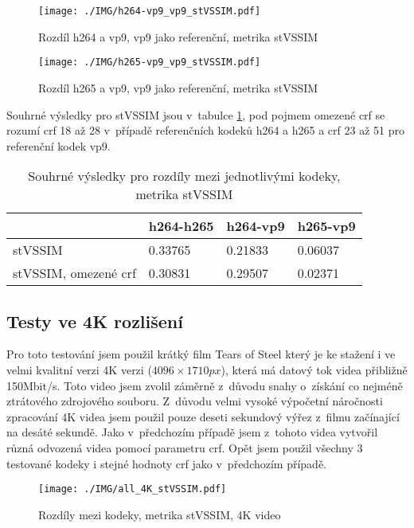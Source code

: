 \documentclass[thesis=M,czech]{FITthesis}[2016/06/26]
\begin{document}
\begin{figure}[htb]\centering
\texttt{[image: ./IMG/h264-vp9\_vp9\_stVSSIM.pdf]}
\caption{Rozdíl h264 a vp9, vp9 jako referenční, metrika stVSSIM}
\label{fig:h264-vp9_vp9_stVSSIM}
\end{figure}

\begin{figure}[htb]\centering
\texttt{[image: ./IMG/h265-vp9\_vp9\_stVSSIM.pdf]}
\caption{Rozdíl h265 a vp9, vp9 jako referenční, metrika stVSSIM}
\label{fig:h265-vp9_vp9_stVSSIM}
\end{figure}

Souhrné výsledky pro stVSSIM jsou v~tabulce \ref{tab:stVSSIM_results}, pod pojmem omezené crf se rozumí crf 18 až 28 v~případě referenčních kodeků h264 a h265 a crf 23 až 51 pro referenční kodek vp9.
\begin{table}[]
\centering
\begin{tabular}{|l|l|l|l|}
\hline
                     & h264-h265 & h264-vp9 & h265-vp9 \\\hline
stVSSIM              & 0.33765   & 0.21833  & 0.06037  \\\hline
stVSSIM, omezené crf & 0.30831   & 0.29507  & 0.02371 \\\hline
\end{tabular}
\caption{Souhrné výsledky pro rozdíly mezi jednotlivými kodeky, metrika stVSSIM}
\label{tab:stVSSIM_results}
\end{table}

\subsection{Testy ve 4K rozlišení}
Pro toto testování jsem použil krátký film Tears of Steel \cite{tos} který je ke stažení i ve velmi kvalitní verzi 4K verzi ($4096 \times 1710 px$)\cite{tos_download}, která má datový tok videa přibližně 150Mbit/s. Toto video jsem zvolil záměrně z~důvodu snahy o~získání co nejméně ztrátového zdrojového souboru. Z~důvodu velmi vysoké výpočetní náročnosti zpracování 4K videa jsem použil pouze deseti sekundový výřez z~filmu začínající na desáté sekundě. Jako v~předchozím případě jsem z~tohoto videa vytvořil různá odvozená videa pomocí parametru crf. Opět jsem použil všechny 3 testované kodeky i stejné hodnoty crf jako v~předchozím případě.

\begin{figure}[htb]\centering
\texttt{[image: ./IMG/all\_4K\_stVSSIM.pdf]}
\caption{Rozdíly mezi kodeky, metrika stVSSIM, 4K video}
\label{fig:all_4K_stVSSIM}
\end{figure}
\end{document}
